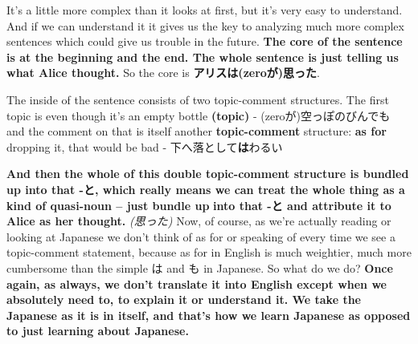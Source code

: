 {}

It's a little more complex than it looks at first, but it's very easy to understand. And if we can understand it it gives us the key to analyzing much more complex sentences which could give us trouble in the future. {\bf The core of the sentence is at the beginning and the end. The whole sentence is just telling us what Alice thought.} So the core is {\bf アリスは(zeroが)思った}.

{}

The inside of the sentence consists of two topic-comment structures. The first topic is even though it's an empty bottle {\bf (topic)} - (zeroが)空っぽのびんでも and the comment on that is itself another {\bf topic-comment} structure: {\bf as for} dropping it, that would be bad - 下へ落として{\bf は}わるい

\thinrule

{\bf And then the whole of this double topic-comment structure is bundled up into that -と, which really means we can treat the whole thing as a kind of quasi-noun -- just bundle up} {\bf into that -と and attribute it to Alice as her thought.} {\em (思った)} Now, of course, as we're actually reading or looking at Japanese we don't think of as for or speaking of every time we see a topic-comment statement, because as for in English is much weightier, much more cumbersome than the simple は and も in Japanese. So what do we do? {\bf Once again, as always, we don't translate it into English except when we absolutely need to, to explain it or understand it. We take the Japanese as it is in itself, and that's how we learn Japanese as opposed to just learning about Japanese.}

\stopsectionlevel

\stopsectionlevel
